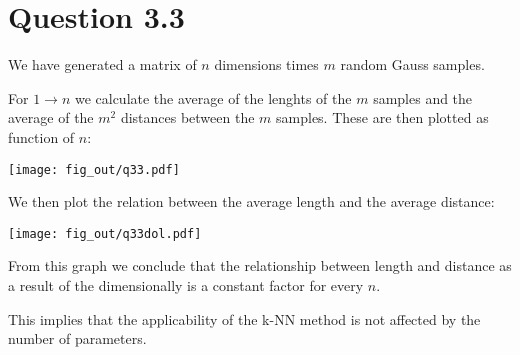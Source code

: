 \section*{Question 3.3}
We have generated a matrix of $n$ dimensions times $m$ random Gauss samples.

For $1 \to n$ we calculate the average of the lenghts of the $m$ samples and the average of the $m^2$ distances between the $m$ samples.
These are then plotted as function of $n$:

\texttt{[image: fig\_out/q33.pdf]}

We then plot the relation between the average length and the average distance:

\texttt{[image: fig\_out/q33dol.pdf]}

From this graph we conclude that the relationship between length and distance
as a result of the dimensionally is a constant factor for every $n$.

This implies that the applicability of the k-NN method is not affected by the number of parameters.